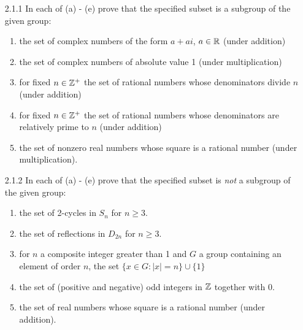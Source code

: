 \begin{enumerate}
   \item[2.1.1]   In each of (a) - (e) prove that the specified subset is a
                  subgroup of the given group:
                  \begin{enumerate}
                     \item the set of complex numbers of the form $a + ai$,
                           $a \in \mathbb{R}$ (under addition)
                     \item the set of complex numbers of absolute value 1 (under
                           multiplication)
                     \item for fixed $n \in \mathbb{Z}^+$ the set of rational numbers
                           whose denominators divide $n$ (under addition)
                     \item for fixed $n \in \mathbb{Z}^+$ the set of rational numbers
                           whose denominators are relatively prime to $n$ (under
                           addition)
                     \item the set of nonzero real numbers whose square is a
                           rational number (under multiplication).
                  \end{enumerate}
   \item[2.1.2]   In each of (a) - (e) prove that the specified subset is
                  \textit{not} a subgroup of the given group:
                  \begin{enumerate}
                     \item the set of 2-cycles in $S_n$ for $n \ge 3$.
                     \item the set of reflections in $D_{2n}$ for $n \ge 3$.
                     \item for $n$ a composite integer greater than 1 and $G$ a
                           group containing an element of order $n$, the set
                           $\{x \in G : |x| = n\} \cup \{1\}$
                     \item the set of (positive and negative) odd integers in
                           $\mathbb{Z}$ together with 0.
                     \item the set of real numbers whose square is a rational
                           number (under addition).
                  \end{enumerate}

\end{enumerate}
